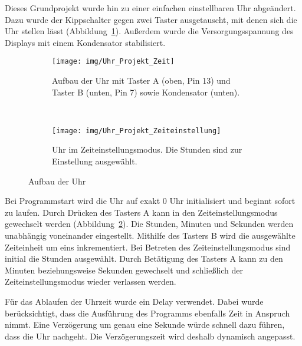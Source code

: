 Dieses Grundprojekt wurde hin zu einer einfachen einstellbaren Uhr abgeändert. Dazu wurde der Kippschalter gegen zwei Taster ausgetauscht, mit denen sich die Uhr stellen lässt (Abbildung~\ref{fig:zeit}). Außerdem wurde die Versorgungsspannung des Displays mit einem Kondensator stabilisiert.

\begin{figure}[p]
    \centering
    \begin{subfigure}[b]{0.6\linewidth}
        \centering
        \texttt{[image: img/Uhr\_Projekt\_Zeit]}
        \caption{Aufbau der Uhr mit Taster A (oben, Pin 13) und Taster B (unten, Pin 7) sowie Kondensator (unten).}\label{fig:zeit}
    \end{subfigure}\enspace%
    \\
    \begin{subfigure}[b]{0.6\linewidth}
        \centering
        \texttt{[image: img/Uhr\_Projekt\_Zeiteinstellung]}
        \caption{Uhr im Zeiteinstellungsmodus. Die Stunden sind zur Einstellung ausgewählt.}\label{fig:zeiteinstell}
    \end{subfigure}
    \caption{Aufbau der Uhr}\label{fig:uhr}
\end{figure}

Bei Programmstart wird die Uhr auf exakt 0 Uhr initialisiert und beginnt sofort zu laufen. Durch Drücken des Tasters A kann in den Zeiteinstellungsmodus gewechselt werden  (Abbildung~\ref{fig:zeiteinstell}). Die Stunden, Minuten und Sekunden werden unabhängig voneinander eingestellt. Mithilfe des Tasters B wird die ausgewählte Zeiteinheit um eins inkrementiert. Bei Betreten des Zeiteinstellungsmodus sind initial die Stunden ausgewählt. Durch Betätigung des Tasters A kann zu den Minuten beziehungsweise Sekunden gewechselt und schließlich der Zeiteinstellungsmodus wieder verlassen werden.

Für das Ablaufen der Uhrzeit wurde ein Delay verwendet. Dabei wurde berücksichtigt, dass die Ausführung des Programms ebenfalls Zeit in Anspruch nimmt. Eine Verzögerung um genau eine Sekunde würde schnell dazu führen, dass die Uhr nachgeht. Die Verzögerungszeit wird deshalb dynamisch angepasst.

